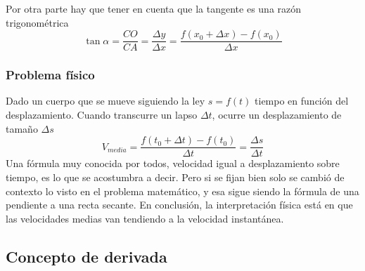 \documentclass[10pt,twoside]{SelfArx} %
\begin{document}
Por otra parte hay que tener en cuenta que la tangente es una razón trigonométrica
\begin{equation}
\tan\alpha=\dfrac{CO}{CA}=\dfrac{\Delta y}{\Delta x}=\dfrac{f(x_{0}+\Delta x)-f(x_{0})}{\Delta x}
\end{equation}










\subsubsection{Problema físico}
Dado un cuerpo que se mueve siguiendo la ley $ s=f(t) $ tiempo en función del desplazamiento. Cuando transcurre un lapso  $ \Delta t $, ocurre un desplazamiento de tamaño $ \Delta s $
\begin{equation}
V_{media}=\dfrac{f(t_{0}+\Delta t)-f(t_{0})}{\Delta t}=\dfrac{\Delta s}{\Delta t}
\end{equation}
Una fórmula muy conocida por todos, \textsf{velocidad igual a desplazamiento sobre tiempo}, es lo que se acostumbra a decir. Pero si se fijan bien solo se cambió de contexto lo visto en el problema matemático, y esa sigue siendo la fórmula de una pendiente a una recta secante. En conclusión, la interpretación física está en que las velocidades medias van tendiendo a la velocidad instantánea.






\subsection{Concepto de derivada}
\end{document}

